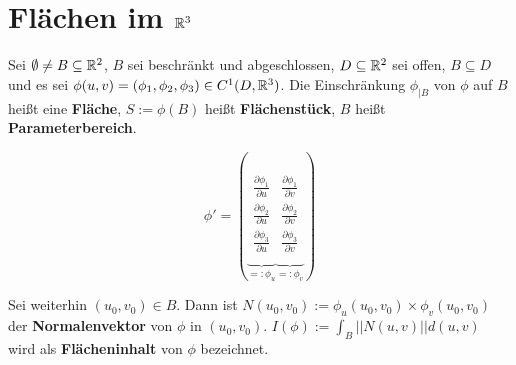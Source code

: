 \documentclass[a4paper,twoside,DIV15,BCOR12mm]{scrbook}
\begin{document}
\chapter{Flächen im $\mathbb{R}^3$}

\begin{definition}
Sei $\emptyset \ne B \subseteq \mathbb{R}^2$, $B$ sei beschränkt und abgeschlossen,
$D \subseteq \mathbb{R}^2$ sei offen, $B \subseteq D$ und es sei $\phi(u,v) = (\phi_{1}, \phi_{2}, \phi_{3}) \in C^{1}(D,\mathbb{R}^3)$.
Die Einschränkung $\phi_{|B}$ von $\phi$ auf $B$ heißt eine \textbf{Fläche}, $S := \phi(B)$ heißt \textbf{Flächenstück}, $B$ heißt 
\textbf{Parameterbereich}.

$$\phi' = 
\left(
\underbrace{
\begin{array}{ccc}
\frac{\partial \phi_1}{\partial u} \\
\frac{\partial \phi_2}{\partial u} \\ 
\frac{\partial \phi_3}{\partial u} \\
\end{array}
}_{=:\phi_u}
\underbrace{
\begin{array}{ccc}
\frac{\partial \phi_1}{\partial v} \\
\frac{\partial \phi_2}{\partial v} \\ 
\frac{\partial \phi_3}{\partial v} \\
\end{array}
}_{=:\phi_v}
\right)$$

Sei weiterhin $(u_0, v_0) \in B$. Dann ist $N(u_0,v_0) := \phi_u(u_0,v_0) \times \phi_v(u_0,v_0)$ der \textbf{Normalenvektor} 
von $\phi$ in $(u_0,v_0)$. $I(\phi) := \int_B ||N(u,v)|| d(u,v)$ wird als \textbf{Flächeninhalt} von $\phi$ bezeichnet.
\end{definition}
\end{document}
